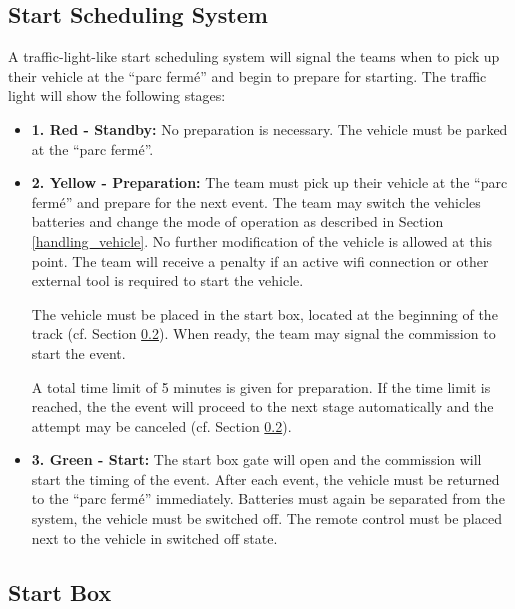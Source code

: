 \subsection{Start Scheduling System}
\label{start_scheduling}

A traffic-light-like start scheduling system will signal the teams when to pick
up their vehicle at the “parc fermé” and begin to prepare for starting. The
traffic light will show the following stages:

\begin{itemize}
	\item \textbf{1. Red - Standby:} \newline
	      No preparation is necessary. The vehicle must be parked at the “parc fermé”.

	\item \textbf{2. Yellow - Preparation:} \newline
	      The team must pick up their vehicle at the “parc fermé” and prepare for the next event. The team may switch the vehicles batteries and change the mode of operation as described in Section \ref{handling_vehicle}. No further modification of the vehicle is allowed at this point.
	      The team will receive a penalty if an active wifi connection or other external tool is required to start the vehicle.

	      The vehicle must be placed in the start box, located at the beginning of the
	      track (cf. Section \ref{start_box}). When ready, the team may signal the 
		  commission to start the event.

	      A total time limit of 5 minutes is given for preparation. If the time limit is
	      reached, the the event will proceed to the next stage automatically and the
	      attempt may be canceled (cf. Section \ref{start_box}).

	\item \textbf{3. Green - Start:} \newline
	      The start box gate will open and the commission will start the timing of the event.
	      After each event, the vehicle must be returned to the “parc fermé” immediately. Batteries must again be separated from the system, the vehicle must be switched off. The remote control must be placed next to the vehicle in switched off state.
\end{itemize}

\subsection{Start Box}
\label{start_box}

